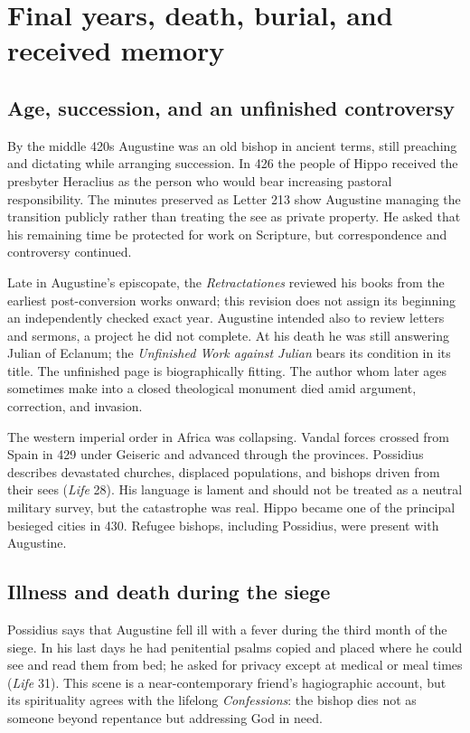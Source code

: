 \section{Final years, death, burial, and received memory}\label{sec:aug-death}

\subsection{Age, succession, and an unfinished controversy}

By the middle 420s Augustine was an old bishop in ancient terms, still
preaching and dictating while arranging succession. In 426 the people of Hippo
received the presbyter Heraclius as the person who would bear increasing
pastoral responsibility. The minutes preserved as Letter 213 show Augustine
managing the transition publicly rather than treating the see as private
property. He asked that his remaining time be protected for work on Scripture,
but correspondence and controversy continued.

Late in Augustine's episcopate, the \emph{Retractationes} reviewed his books
from the earliest post-conversion works onward; this revision does not assign
its beginning an independently checked exact year. Augustine intended also to review letters and
sermons, a project he did not complete. At his death he was still answering
Julian of Eclanum; the \emph{Unfinished Work against Julian} bears its
condition in its title. The unfinished page is biographically fitting. The
author whom later ages sometimes make into a closed theological monument died
amid argument, correction, and invasion.

The western imperial order in Africa was collapsing. Vandal forces crossed
from Spain in 429 under Geiseric and advanced through the provinces. Possidius
describes devastated churches, displaced populations, and bishops driven from
their sees (\emph{Life} 28). His language is lament and should not be treated
as a neutral military survey, but the catastrophe was real. Hippo became one
of the principal besieged cities in 430. Refugee bishops, including Possidius,
were present with Augustine.

\subsection{Illness and death during the siege}

Possidius says that Augustine fell ill with a fever during the third month of
the siege. In his last days he had penitential psalms copied and placed where
he could see and read them from bed; he asked for privacy except at medical or
meal times (\emph{Life} 31). This scene is a near-contemporary friend's
hagiographic account, but its spirituality agrees with the lifelong
\emph{Confessions}: the bishop dies not as someone beyond repentance but
addressing God in need.

